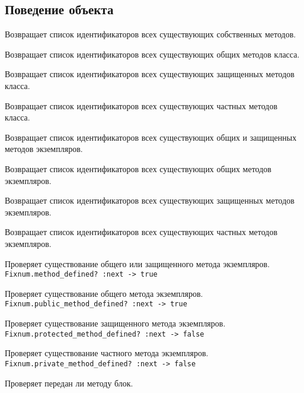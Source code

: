 \subsection{Поведение объекта}

\begin{methodlist}
  Возвращает список идентификаторов всех существующих собственных методов.

  Возвращает список идентификаторов всех существующих общих методов класса.

  Возвращает список идентификаторов всех существующих защищенных методов класса.

  Возвращает список идентификаторов всех существующих частных методов класса.

  Возвращает список идентификаторов всех существующих общих и защищенных методов экземпляров.

  Возвращает список идентификаторов всех существующих общих методов экземпляров.

  Возвращает список идентификаторов всех существующих защищенных методов экземпляров.

  Возвращает список идентификаторов всех существующих частных методов экземпляров.

  Проверяет существование общего или защищенного метода экземпляров.
  \\\verb!Fixnum.method_defined? :next -> true!

  Проверяет существование общего метода экземпляров. 
  \\\verb!Fixnum.public_method_defined? :next -> true!

  Проверяет существование защищенного метода экземпляров. 
  \\\verb!Fixnum.protected_method_defined? :next -> false!

  Проверяет существование частного метода экземпляров. 
  \\\verb!Fixnum.private_method_defined? :next -> false!

  Проверяет передан ли методу блок.
\end{methodlist} 

